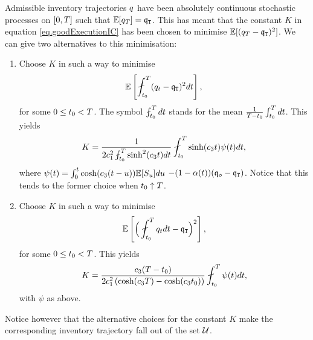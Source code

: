 \documentclass[10pt,a4paper]{article}
\begin{document}
%	
\begin{remark}	\label{remark.alternativeFinalConstraints}
Admissible inventory trajectories $q$ have been absolutely continuous stochastic processes on ${[0,T]}$ such that $\mathbb{{E}}[q_T] = \mathfrak{q}_{\mathtt{T} }$. This has meant that the constant $K$ in equation \eqref{eq.goodExecutionIC} has been chosen to minimise $\mathbb{{E}} [(q_T - \mathfrak{q}_{\mathtt{T} }) ^{2}]$. We can give two alternatives to this minimisation:
\begin{enumerate}
	\item Choose $K$ in such a way to minimise 
	\begin{equation*}
	\Expectation \left[ \fint_{t_0}^{\timeHorizon} (\inventory_t-\liquidationTarget)\squared dt \right] ,
	\end{equation*}
	for some $0\leq t_0 <T$. The symbol $ \fint_{t_0}^{\timeHorizon} dt$ stands for the mean $ \frac{1}{T - t_0}\int_{t_0}^{T}dt$. This yields
	\begin{equation*}
	K= \frac{1}{2\coeffMarketImpact\squared \fint_{t_0}^{\timeHorizon}\sinh\squared (\ratioAversionOverImpact t) dt}
	\fint_{t_0}^{\timeHorizon} \sinh(\ratioAversionOverImpact t) \psi(t) dt,
	\end{equation*}
	where $\psi(t)=\int_{0}^{t} \cosh(c_{3} (t-u))\mathbb{{E}}[S_u] du $ $- (1-\alpha(t))(\mathfrak{q_0} - \mathfrak{q}_{\mathtt{T} })$. Notice that this tends to the former choice when $t_0 \uparrow T$.
	\item Choose $K$ in such a way to minimise
	\begin{equation*}
	\Expectation \left[
	\Big(
	\fint_{t_0}^{\timeHorizon}\inventory_tdt -\liquidationTarget
	\Big)\squared
	\right],
	\end{equation*}
	for some $0\leq t_0 <T$. This yields
	\begin{equation*}
	K= \frac{\ratioAversionOverImpact (\timeHorizon - t_0)}
	{2\coeffMarketImpact\squared 
		\left(
		\cosh(\ratioAversionOverImpact\timeHorizon) - \cosh(\ratioAversionOverImpact t_0)
		\right)
	}
	\fint_{t_0}^{\timeHorizon} \psi(t) dt,
	\end{equation*}
	with $\psi$ as above. 
\end{enumerate}
Notice however that the alternative choices for the constant $K$ make the corresponding inventory trajectory fall out of the set $\mathcal{U}$.
\end{remark}
\end{document}
